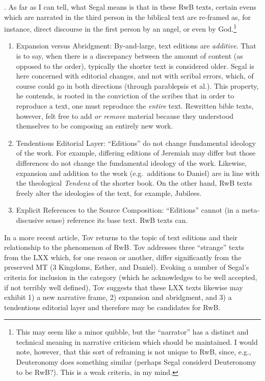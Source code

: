 \begin{enumerate}
  \autocite[22]{segal_henze2005}. As far as I can tell, what Segal means
  is that in these RwB texts, certain evens which are narrated in the
  third person in the biblical text are re-framed as, for instance,
  direct discourse in the first person by an angel, or even by
  God.\footnote{This may seem like a minor quibble, but the ``narrator''
    has a distinct and technical meaning in narrative criticism which
    should be maintained. I would note, however, that this sort of
    reframing is not unique to RwB, since, e.g., Deuteronomy does
    something similar (perhaps Segal considerd Deuteronomy to be RwB?).
    This is a weak criteria, in my mind.}
\end{enumerate}

\begin{enumerate}
\def\labelenumi{\arabic{enumi}.}
\setcounter{enumi}{3}
\item
  Expansion versus Abridgment: By-and-large, text editions are
  \emph{additive}. That is to say, when there is a discrepancy between
  the amount of content (as opposed to the order), typically the shorter
  text is considered older. Segal is here concerned with editorial
  changes, and not with scribal errors, which, of course could go in
  both directions (through parablepsis et al.). This property, he
  contends, is rooted in the conviction of the scribes that in order to
  reproduce a text, one must reproduce the \emph{entire}
  text.\autocite[24]{segal_henze2005} Rewritten bible texts, however,
  felt free to add \emph{or remove} material because they understood
  themselves to be composing an entirely new
  work.\autocite[24]{segal_henze2005}
\item
  Tendentious Editorial Layer: ``Editions'' do not change fundamental
  ideology of the work. For example, differing editions of Jeremiah may
  differ but those differences do not change the fundamental ideology of
  the work. Likewise, expansion and addition to the work (e.g.~additions
  to Daniel) are in line with the theological \emph{Tendenz} of the
  shorter book. On the other hand, RwB texts freely alter the ideologies
  of the text, for example, Jubilees.\autocite[25]{segal_henze2005}
\item
  Explicit References to the Source Composition: ``Editions'' cannot (in
  a meta-discusive sense) reference its base text. RwB texts can.
\end{enumerate}

In a more recent article, Tov returns to the topic of text editions and
their relationship to the phenomenon of
RwB\autocite{tov_krarrer-kraus2008}. Tov addresses three ``strange''
texts from the LXX which, for one reason or another, differ
significantly from the preserved MT (3 Kingdoms, Esther, and Daniel).
Evoking a number of Segal's criteria\autocite{segal_henze2005} for
inclusion in the category (which he acknowledges to be well accepted, if
not terribly well defined), Tov suggests that these LXX texts likewise
may exhibit 1) a new narrative frame, 2) expansion and abridgment, and
3) a tendentious editorial layer and therefore may be candidates for
RwB.

